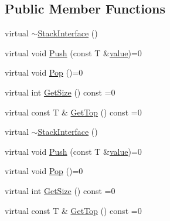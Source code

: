 \subsection*{Public Member Functions}
\begin{DoxyCompactItemize}
\item 
virtual \mbox{\hyperlink{classtesting_1_1gmock__function__mocker__test_1_1_stack_interface_a8980c220022444a6be6e5f346a8de7e5}{$\sim$\+Stack\+Interface}} ()
\item 
virtual void \mbox{\hyperlink{classtesting_1_1gmock__function__mocker__test_1_1_stack_interface_a94f18eeca0a9ef27ffdaffab40eaa5b7}{Push}} (const T \&\mbox{\hyperlink{_obj__test_2lib_2googletest-master_2googlemock_2test_2gmock-matchers__test_8cc_a337b8a670efc0b086ad3af163f3121b6}{value}})=0
\item 
virtual void \mbox{\hyperlink{classtesting_1_1gmock__function__mocker__test_1_1_stack_interface_a9316d84cdc42996c0a0a2ae89b693926}{Pop}} ()=0
\item 
virtual int \mbox{\hyperlink{classtesting_1_1gmock__function__mocker__test_1_1_stack_interface_a09def067a391dbb6a35d5b52e616774c}{Get\+Size}} () const =0
\item 
virtual const T \& \mbox{\hyperlink{classtesting_1_1gmock__function__mocker__test_1_1_stack_interface_a253773e41b8014042ab554d5f8e89e36}{Get\+Top}} () const =0
\item 
virtual \mbox{\hyperlink{classtesting_1_1gmock__function__mocker__test_1_1_stack_interface_a8980c220022444a6be6e5f346a8de7e5}{$\sim$\+Stack\+Interface}} ()
\item 
virtual void \mbox{\hyperlink{classtesting_1_1gmock__function__mocker__test_1_1_stack_interface_a94f18eeca0a9ef27ffdaffab40eaa5b7}{Push}} (const T \&\mbox{\hyperlink{_obj__test_2lib_2googletest-master_2googlemock_2test_2gmock-matchers__test_8cc_a337b8a670efc0b086ad3af163f3121b6}{value}})=0
\item 
virtual void \mbox{\hyperlink{classtesting_1_1gmock__function__mocker__test_1_1_stack_interface_a9316d84cdc42996c0a0a2ae89b693926}{Pop}} ()=0
\item 
virtual int \mbox{\hyperlink{classtesting_1_1gmock__function__mocker__test_1_1_stack_interface_a09def067a391dbb6a35d5b52e616774c}{Get\+Size}} () const =0
\item 
virtual const T \& \mbox{\hyperlink{classtesting_1_1gmock__function__mocker__test_1_1_stack_interface_a253773e41b8014042ab554d5f8e89e36}{Get\+Top}} () const =0
\end{DoxyCompactItemize}


